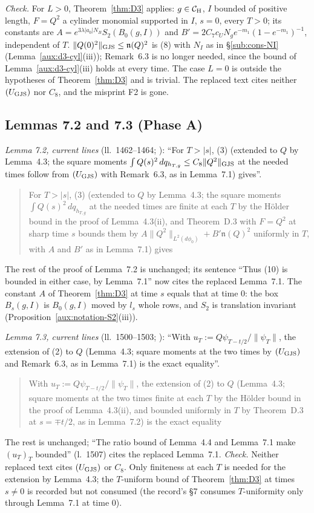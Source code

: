 \emph{Check.}  For $L>0$, Theorem~\ref{thm:D3} applies: $g\in\mathcal{C}_{\mathrm H}$, $I$ bounded of positive
length, $F=Q^2$ a cylinder monomial supported in $I$, $s=0$, every $T>0$; its constants are
$A=e^{3\lambda|a_0|N_B}S_2(B_0(g,I))$ and $B'=2C_7c_UN_ge^{-m_1}(1-e^{-m_1})^{-1}$, independent of
$T$.  $\lVert Q(0)^2\rVert_{\mathrm{GJS}}\le\mathfrak n(Q)^2$ is (8) with $N_I$ as in \S\ref{sub:cons-NI}
(Lemma~\ref{aux:d3-cyl}(iii)); Remark~6.3 is no longer needed, since the bound of
Lemma~\ref{aux:d3-cyl}(iii) holds at every time.  The case $L=0$ is outside the hypotheses of
Theorem~\ref{thm:D3} and is trivial.  The replaced text cites neither $(U_{\rm GJS})$ nor $C_8$, and
the misprint F2 is gone.

\subsection{Lemmas 7.2 and 7.3 (Phase A)}\label{sub:cons-7273}

\emph{Lemma 7.2, current lines} (ll.~1462--1464; \cite[p.~20]{R}): ``For $T>|s|$, (3) (extended to
$Q$ by Lemma~4.3; the square moments $\int Q(s)^2\,dq_{h_{T,g}}\le C_8\|Q^2\|_{\rm GJS}$ at the
needed times follow from $(U_{\rm GJS})$ with Remark~6.3, as in Lemma~7.1) gives''.
\begin{quote}\small
For $T>|s|$, (3) (extended to $Q$ by Lemma~4.3; the square moments $\int Q(s)^2\,dq_{h_{T,g}}$ at
the needed times are finite at each $T$ by the H\"older bound in the proof of Lemma~4.3(ii), and
Theorem~D.3 with $F=Q^2$ at sharp time $s$ bounds them by
$A\|Q^2\|_{L^2(d\phi_0)}+B'\mathfrak n(Q)^2$ uniformly in $T$, with $A$ and $B'$ as in Lemma~7.1)
gives
\end{quote}
The rest of the proof of Lemma~7.2 is unchanged; its sentence ``Thus (10) is bounded in either case,
by Lemma~7.1'' now cites the replaced Lemma~7.1.  The constant $A$ of Theorem~\ref{thm:D3} at time
$s$ equals that at time $0$: the box $B_s(g,I)$ is $B_0(g,I)$ moved by $l_s$ whole rows, and
$S_2$ is translation invariant (Proposition~\ref{aux:notation-S2}(iii)).

\emph{Lemma 7.3, current lines} (ll.~1500--1503; \cite[p.~21]{R}): ``With
$u_T:=Q\psi_{T-t/2}/\|\psi_T\|$, the extension of (2) to $Q$ (Lemma~4.3; square moments at the two
times by $(U_{\rm GJS})$ and Remark~6.3, as in Lemma~7.1) is the exact equality''.
\begin{quote}\small
With $u_T:=Q\psi_{T-t/2}/\|\psi_T\|$, the extension of (2) to $Q$ (Lemma~4.3; square moments at
the two times finite at each $T$ by the H\"older bound in the proof of Lemma~4.3(ii), and bounded
uniformly in $T$ by Theorem~D.3 at $s=\mp t/2$, as in Lemma~7.2) is the exact equality
\end{quote}
The rest is unchanged; ``The ratio bound of Lemma~4.4 and Lemma~7.1 make $(u_T)_T$ bounded''
(l.~1507) cites the replaced Lemma~7.1.  \emph{Check.}  Neither replaced text cites $(U_{\rm GJS})$ or
$C_8$.  Only finiteness at each $T$ is needed for the extension by Lemma~4.3; the $T$-uniform bound
of Theorem~\ref{thm:D3} at times $s\ne0$ is recorded but not consumed (the record's \S7 consumes
$T$-uniformity only through Lemma~7.1 at time $0$).

